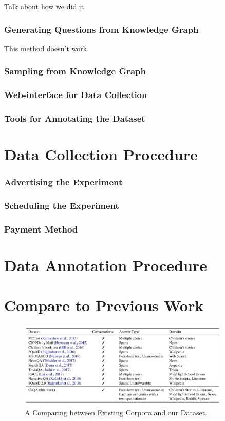 \documentclass[bsc,frontabs,twoside,singlespacing,parskip,deptreport]{infthesis}     %
\begin{document}
Talk about how we did it.

\subsubsection*{Generating Questions from Knowledge Graph}
This method doesn't work.
\subsubsection*{Sampling from Knowledge Graph}
\subsubsection*{Web-interface for Data Collection}
\subsubsection*{Tools for Annotating the Dataset}



\section{Data Collection Procedure}



\subsubsection*{Advertising the Experiment}
\subsubsection*{Scheduling the Experiment}
\subsubsection*{Payment Method}

\section{Data Annotation Procedure}



\section{Compare to Previous Work}


\begin{figure}[h]
    \centering
    \includegraphics[width=0.9\textwidth]{table.jpeg}
    \caption{A Comparing between Existing Corpora and our Dataset.}
    \label{fig:TABLE}
\end{figure}
\end{document}
